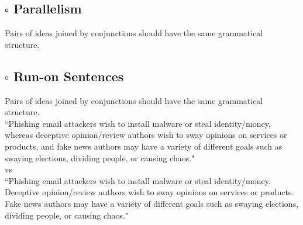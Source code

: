 \documentclass{article}
\begin{document}
\begin{adjustwidth}{1cm}{}
    \subsection*{$\square$ Parallelism}

    \begin{adjustwidth}{1cm}{}
        Pairs of ideas joined by conjunctions should have the same grammatical structure. 
    \end{adjustwidth}

    \subsection*{$\square$ Run-on Sentences}

    \begin{adjustwidth}{1cm}{}
        Pairs of ideas joined by conjunctions should have the same grammatical structure. 
        \\

        ``Phishing email attackers wish to install malware or steal identity/money, whereas deceptive opinion/review authors wish to sway opinions on services or products, and fake news authors may have a variety of different goals such as swaying elections, dividing people, or causing chaos."
        \\

        vs 
        \\

        ``Phishing email attackers wish to install malware or steal identity/money. Deceptive opinion/review authors wish to sway opinions on services or products. Fake news authors may have a variety of different goals such as swaying elections, dividing people, or causing chaos."
    \end{adjustwidth}
\end{adjustwidth}
\end{document}
